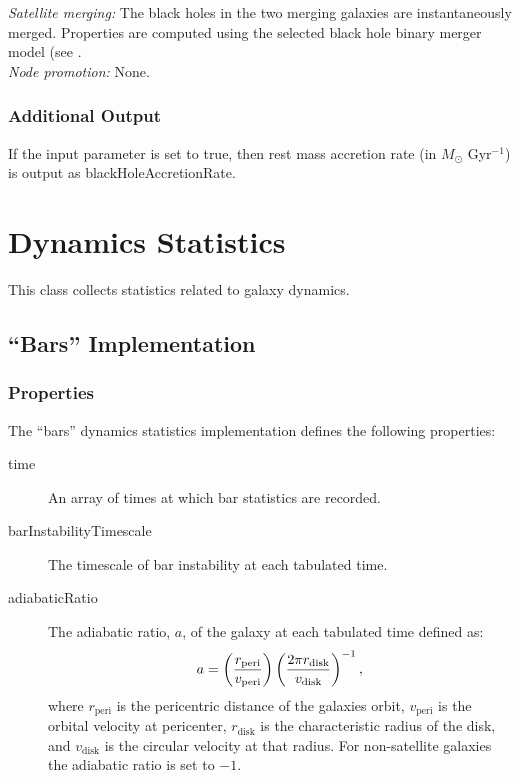 \noindent\emph{Satellite merging:} The black holes in the two merging galaxies are instantaneously merged. Properties are computed using the selected black hole binary merger model (see .\\

\noindent\emph{Node promotion:} None.\\

\subsubsection{Additional Output}

If the {\normalfont \ttfamily [blackHoleOutputAccretion]} input parameter is set to true, then rest mass accretion rate (in $M_\odot$ Gyr$^{-1}$) is output as {\normalfont \ttfamily blackHoleAccretionRate}.

\section{Dynamics Statistics}

This class collects statistics related to galaxy dynamics.

\subsection{``Bars'' Implementation}

\subsubsection{Properties}

The ``bars'' dynamics statistics implementation defines the following properties:
\begin{description}
 \item [{\normalfont \ttfamily time}] An array of times at which bar statistics are recorded.
 \item [{\normalfont \ttfamily barInstabilityTimescale}] The timescale of bar instability at each tabulated time.
 \item [{\normalfont \ttfamily adiabaticRatio}] The adiabatic ratio, $a$, of the galaxy at each tabulated time defined as:
   \begin{equation}
     a = \left( {r_\mathrm{peri} \over v_\mathrm{peri}} \right) \left( {2 \pi r_\mathrm{disk} \over v_\mathrm{disk}} \right)^{-1},
   \end{equation}
   where $r_\mathrm{peri}$ is the pericentric distance of the galaxies orbit, $v_\mathrm{peri}$ is the orbital velocity at pericenter, $r_\mathrm{disk}$ is the characteristic radius of the disk, and $v_\mathrm{disk}$ is the circular velocity at that radius. For non-satellite galaxies the adiabatic ratio is set to $-1$.
\end{description}

